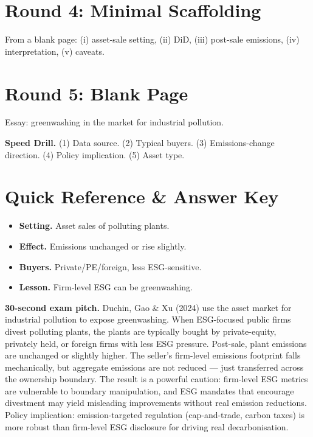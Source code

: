 \documentclass[11pt]{article}
\begin{document}
\section*{Round 4: Minimal Scaffolding}
From a blank page: (i) asset-sale setting, (ii) DiD, (iii) post-sale emissions, (iv) interpretation, (v) caveats.

\section*{Round 5: Blank Page}
Essay: greenwashing in the market for industrial pollution.

\vspace{6pt}
\begin{drillbox}
\textbf{Speed Drill.} (1) Data source. (2) Typical buyers. (3) Emissions-change direction. (4) Policy implication. (5) Asset type.
\end{drillbox}

\section*{Quick Reference \& Answer Key}
\begin{answerbox}
\begin{itemize}
\item \textbf{Setting.} Asset sales of polluting plants.
\item \textbf{Effect.} Emissions unchanged or rise slightly.
\item \textbf{Buyers.} Private/PE/foreign, less ESG-sensitive.
\item \textbf{Lesson.} Firm-level ESG can be greenwashing.
\end{itemize}
\end{answerbox}

\begin{keybox}
\textbf{30-second exam pitch.} Duchin, Gao \& Xu (2024) use the asset market for industrial pollution to expose greenwashing. When ESG-focused public firms divest polluting plants, the plants are typically bought by private-equity, privately held, or foreign firms with less ESG pressure. Post-sale, plant emissions are unchanged or slightly higher. The seller's firm-level emissions footprint falls mechanically, but aggregate emissions are not reduced --- just transferred across the ownership boundary. The result is a powerful caution: firm-level ESG metrics are vulnerable to boundary manipulation, and ESG mandates that encourage divestment may yield misleading improvements without real emission reductions. Policy implication: emission-targeted regulation (cap-and-trade, carbon taxes) is more robust than firm-level ESG disclosure for driving real decarbonisation.
\end{keybox}
\end{document}
